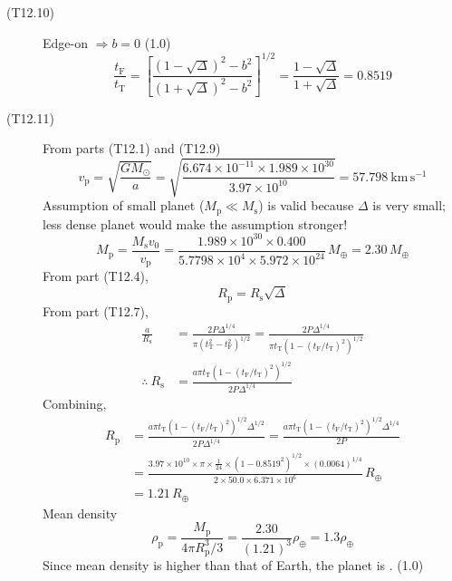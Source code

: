 \begin{description}
\item[(T12.10)] Edge-on $\Rightarrow b = 0$ \hfill(1.0)
\[
\frac{t_{\mathrm{F}}}{t_{\mathrm{T}}}
 = \left[\frac{(1 - \sqrt{\Delta})^2 - b^2}
              {(1 + \sqrt{\Delta})^2 - b^2}\right]^{1/2}
 = \frac{1 - \sqrt{\Delta}}{1 + \sqrt{\Delta}}
 = \boxed{0.8519} \tag*{(1.0)}
\]

\item[(T12.11)] From parts (T12.1) and (T12.9)
\[
v_{\mathrm{p}} = \sqrt{\frac{GM_\odot}{a}}
 = \sqrt{\frac{6.674 \times 10^{-11} \times 1.989 \times 10^{30}}
              {3.97 \times 10^{10}}}
 = 57.798\ \mathrm{km\,s^{-1}} \tag*{(1.0)}
\]
Assumption of small planet ($M_{\mathrm{p}} \ll M_{\mathrm{s}}$) is valid
because $\Delta$ is very small; less dense planet would make the assumption
stronger!
\[
M_{\mathrm{p}} = \frac{M_{\mathrm{s}}v_0}{v_{\mathrm{p}}}
 = \frac{1.989 \times 10^{30} \times 0.400}
        {5.7798 \times 10^{4} \times 5.972 \times 10^{24}}\,M_\oplus
 = \boxed{2.30\,M_\oplus} \tag*{(2.0)}
\]
From part (T12.4),
\[
R_{\mathrm{p}} = R_{\mathrm{s}}\sqrt{\Delta}
\]
From part (T12.7),
\begin{align*}
\frac{a}{R_{\mathrm{s}}}
 &= \frac{2P\Delta^{1/4}}{\pi(t_{\mathrm{T}}^2 - t_{\mathrm{F}}^2)^{1/2}}
  = \frac{2P\Delta^{1/4}}
         {\pi t_{\mathrm{T}}(1 - (t_{\mathrm{F}}/t_{\mathrm{T}})^2)^{1/2}}\\
\therefore\ R_{\mathrm{s}}
 &= \frac{a\pi t_{\mathrm{T}}
          (1 - (t_{\mathrm{F}}/t_{\mathrm{T}})^2)^{1/2}}{2P\Delta^{1/4}}
\end{align*}
Combining,
\begin{align*}
R_{\mathrm{p}} &= \frac{a\pi t_{\mathrm{T}}
   (1 - (t_{\mathrm{F}}/t_{\mathrm{T}})^2)^{1/2}\Delta^{1/2}}
   {2P\Delta^{1/4}}
 = \frac{a\pi t_{\mathrm{T}}
   (1 - (t_{\mathrm{F}}/t_{\mathrm{T}})^2)^{1/2}\Delta^{1/4}}{2P}
 \tag*{(2.0)}\\
&= \frac{3.97 \times 10^{10} \times \pi \times \frac{1}{24}
   \times (1 - 0.8519^2)^{1/2} \times (0.0064)^{1/4}}
   {2 \times 50.0 \times 6.371 \times 10^{6}}\,R_\oplus\\
&= \boxed{1.21\,R_\oplus} \tag*{(1.0)}
\end{align*}
Mean density
\[
\rho_{\mathrm{p}} = \frac{M_{\mathrm{p}}}{4\pi R_{\mathrm{p}}^3/3}
 = \frac{2.30}{(1.21)^3}\rho_\oplus = 1.3\rho_\oplus \tag*{(1.0)}
\]
Since mean density is higher than that of Earth, the planet is
. \hfill(1.0)


\end{description}
